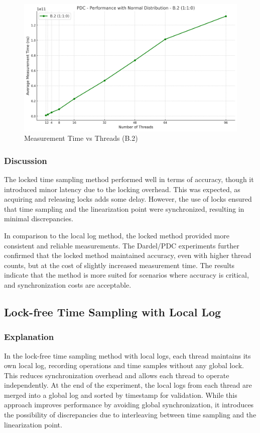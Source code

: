 \documentclass{article}
\begin{document}
\begin{figure}[H]
    \centering
    \includegraphics[width=\textwidth]{LaTex/images/Lab 3 2.3.2.4.png}
    \caption{Measurement Time vs Threads (B.2)}
    \label{fig:enter-label}
\end{figure}

\subsubsection{Discussion}
The locked time sampling method performed well in terms of accuracy, though it introduced minor latency due to the locking overhead. This was expected, as acquiring and releasing locks adds some delay. However, the use of locks ensured that time sampling and the linearization point were synchronized, resulting in minimal discrepancies.

In comparison to the local log method, the locked method provided more consistent and reliable measurements. The Dardel/PDC experiments further confirmed that the locked method maintained accuracy, even with higher thread counts, but at the cost of slightly increased measurement time. The results indicate that the method is more suited for scenarios where accuracy is critical, and synchronization costs are acceptable.

\newpage
\subsection{Lock-free Time Sampling with Local Log}

\subsubsection{Explanation}
In the lock-free time sampling method with local logs, each thread maintains its own local log, recording operations and time samples without any global lock. This reduces synchronization overhead and allows each thread to operate independently. At the end of the experiment, the local logs from each thread are merged into a global log and sorted by timestamp for validation. While this approach improves performance by avoiding global synchronization, it introduces the possibility of discrepancies due to interleaving between time sampling and the linearization point.
\end{document}
